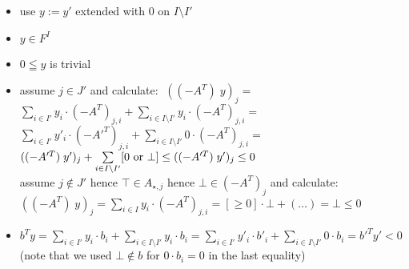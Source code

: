 \documentclass[]{article}
\begin{document}
\begin{itemize}
\begin{itemize}
	\item use $y := y'$ extended with $0$ on $I \setminus I'$
	\item $ y \in F^I $
	\item $0 \leqq y$ is trivial
	\item assume $j \in J'$ and calculate: $\; ((-A^T)\; y)_j = $\\
	$ \sum\limits_{i \in I'} y_i \cdot (-A^T)_{j,i} + \sum\limits_{i \in I \setminus I'} y_i \cdot (-A^T)_{j,i} = $\\
	$ \sum\limits_{i \in I'} y'_i \cdot (-A'^T)_{j,i} + \sum\limits_{i \in I \setminus I'} 0 \cdot (-A^T)_{j,i} = $\\
	$ ((-A'^T)\; y')_j + \sum\limits_{i \in I \setminus I'} [0 \textup{~or~} \bot] \le ((-A'^T)\; y')_j \le 0  $\\
	assume $j \notin J'$ hence $\top \in A_{\star, j}$ hence $\bot \in (-A^T)_{j}$ and calculate:
	$ ((-A^T)\; y)_j = \sum\limits_{i \in I} y_i \cdot (-A^T)_{j,i} = [\ge 0] \cdot \bot + (\dots) = \bot \le 0 $
	\item $ b^T y
	= \sum\limits_{i \in I'} y_i \cdot b_i + \sum\limits_{i \in I \setminus I'} y_i \cdot b_i
	= \sum\limits_{i \in I'} y'_i \cdot b'_i + \sum\limits_{i \in I \setminus I'} 0 \cdot b_i
	= b'^T y' < 0 $
	(note that we used $\bot \notin b$ for $0 \cdot b_i = 0$ in the last equality)
\end{itemize}
\end{itemize}
\end{document}
